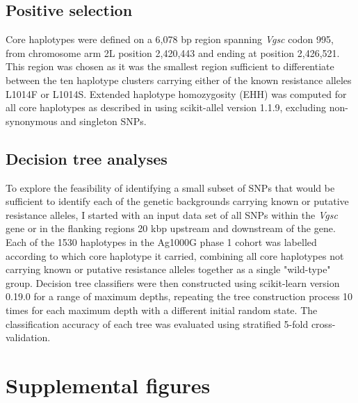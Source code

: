 \documentclass[a4paper,11pt,abstracton,hidelinks]{scrartcl}
\begin{document}
\subsection{Positive selection}\label{subsec:methods-selection}


Core haplotypes were defined on a 6,078 bp region spanning \textit{Vgsc} codon 995, from chromosome arm 2L position 2,420,443 and ending at position 2,426,521.
%
This region was chosen as it was the smallest region sufficient to differentiate between the ten haplotype clusters carrying either of the known resistance alleles L1014F or L1014S.
%
Extended haplotype homozygosity (EHH) was computed for all core haplotypes as described in \textcite{Sabeti2002} using scikit-allel version 1.1.9, excluding non-synonymous and singleton SNPs.


\subsection{Decision tree analyses}\label{subsec:methods-dts}


To explore the feasibility of identifying a small subset of SNPs that would be sufficient to identify each of the genetic backgrounds carrying known or putative resistance alleles, I started with an input data set of all SNPs within the \textit{Vgsc} gene or in the flanking regions 20 kbp upstream and downstream of the gene.
%
Each of the 1530 haplotypes in the Ag1000G phase 1 cohort was labelled according to which core haplotype it carried, combining all core haplotypes not carrying known or putative resistance alleles together as a single "wild-type" group.
%
Decision tree classifiers were then constructed using scikit-learn version 0.19.0 for a range of maximum depths, repeating the tree construction process 10 times for each maximum depth with a different initial random state.
%
The classification accuracy of each tree was evaluated using stratified 5-fold cross-validation.


\printbibliography


\clearpage
\beginsupplement
\section{Supplemental figures}\label{sec:supplemental-figures}
\end{document}
